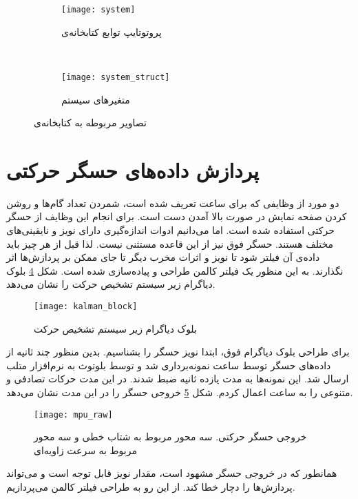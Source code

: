 \begin{figure}[h]
	\centering
	\begin{subfigure}{0.95\textwidth}
		\centering
		\texttt{[image: system]}
		\caption{پروتوتایپ توابع کتابخانه‌ی }
		\label{fig:system}
	\end{subfigure} \\
	\begin{subfigure}{0.95\textwidth}
		\centering
		\texttt{[image: system\_struct]}
		\caption{متغیرهای  سیستم}
		\label{fig:system_struct}
	\end{subfigure}
	\caption{تصاویر مربوطه به کتابخانه‌ی }
\end{figure}

\section{پردازش داده‌های حسگر حرکتی} \label{sec:kalman}
دو مورد از وظایفی که برای ساعت تعریف شده است، شمردن تعداد گام‌ها و روشن کردن صفحه نمایش در صورت بالا آمدن دست است. برای انجام این وظایف از حسگر حرکتی  استفاده شده است. اما می‌دانیم ادوات اندازه‌گیری دارای نویز و نایقینی‌های مختلف هستند. حسگر فوق نیز از این قاعده مستثنی نیست. لذا قبل از هر چیز باید داده‌ی آن فیلتر شود تا نویز و اثرات مخرب دیگر تا جای ممکن بر پردازش‌ها اثر نگذارند. به این منظور یک فیلتر کالمن طراحی و پیاده‌سازی شده است. شکل \ref{fig:kalman-block} بلوک دیاگرام زیر سیستم تشخیص حرکت را نشان می‌دهد.

\begin{figure}[h]
	\centering
	\texttt{[image: kalman\_block]}
	\caption{بلوک دیاگرام زیر سیستم تشخیص حرکت}
	\label{fig:kalman-block}
\end{figure}

برای طراحی بلوک دیاگرام فوق، ابتدا نویز حسگر را بشناسیم. بدین منظور چند ثانیه از داده‌های حسگر توسط ساعت نمونه‌برداری شد و توسط بلوتوث به نرم‌افزار متلب ارسال شد. این نمونه‌ها به مدت یازده ثانیه ضبط شدند. در این مدت حرکات تصادفی و متنوعی را به ساعت اعمال کردم. شکل \ref{fig:mpu-raw} خروجی حسگر را در این مدت نشان می‌دهد.

\begin{figure}[h]
	\centering
	\texttt{[image: mpu\_raw]}
	\caption{خروجی حسگر حرکتی. سه محور مربوط به شتاب خطی و سه محور مربوط به سرعت زاویه‌ای}
	\label{fig:mpu-raw}
\end{figure}

همانطور که در خروجی حسگر مشهود است، مقدار نویز قابل توجه است و می‌تواند پردازش‌ها را دچار خطا کند. از این رو به طراحی فیلتر کالمن می‌پردازیم.


